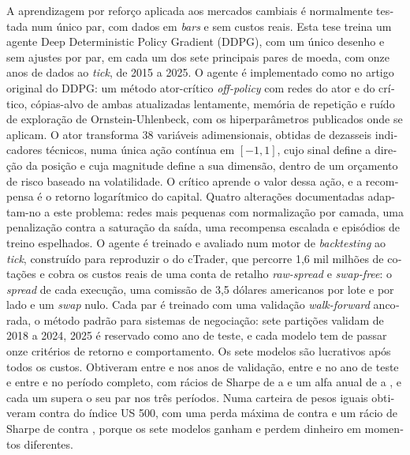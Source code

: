 \acresetall
\begin{otherlanguage}{portuguese}
\noindent A aprendizagem por reforço aplicada aos mercados cambiais é normalmente testada num único par, com dados em \textit{bars} e sem custos reais. Esta tese treina um agente Deep Deterministic Policy Gradient (DDPG), com um único desenho e sem ajustes por par, em cada um dos sete principais pares de moeda, com onze anos de dados ao \textit{tick}, de 2015 a 2025. O agente é implementado como no artigo original do DDPG: um método ator-crítico \textit{off-policy} com redes do ator e do crítico, cópias-alvo de ambas atualizadas lentamente, memória de repetição e ruído de exploração de Ornstein-Uhlenbeck, com os hiperparâmetros publicados onde se aplicam. O ator transforma 38 variáveis adimensionais, obtidas de dezasseis indicadores técnicos, numa única ação contínua em $[-1, 1]$, cujo sinal define a direção da posição e cuja magnitude define a sua dimensão, dentro de um orçamento de risco baseado na volatilidade. O crítico aprende o valor dessa ação, e a recompensa é o retorno logarítmico do capital. Quatro alterações documentadas adaptam-no a este problema: redes mais pequenas com normalização por camada, uma penalização contra a saturação da saída, uma recompensa escalada e episódios de treino espelhados. O agente é treinado e avaliado num motor de \textit{backtesting} ao \textit{tick}, construído para reproduzir o do cTrader, que percorre 1,6 mil milhões de cotações e cobra os custos reais de uma conta de retalho \textit{raw-spread} e \textit{swap-free}: o \textit{spread} de cada execução, uma comissão de 3,5 dólares americanos por lote e por lado e um \textit{swap} nulo. Cada par é treinado com uma validação \textit{walk-forward} ancorada, o método padrão para sistemas de negociação: sete partições validam de 2018 a 2024, 2025 é reservado como ano de teste, e cada modelo tem de passar onze critérios de retorno e comportamento. Os sete modelos são lucrativos após todos os custos. Obtiveram entre \ResultStitchedMinPT{} e \ResultStitchedMaxPT{} nos anos de validação, entre \ResultTestMinPT{} e \ResultTestMaxPT{} no ano de teste e entre \ResultFullMinPT{} e \ResultFullMaxPT{} no período completo, com rácios de Sharpe de \ResultSharpeMinPT{} a \ResultSharpeMaxPT{} e um alfa anual de \ResultAlphaMinPT{} a \ResultAlphaMaxPT{}, e cada um supera o seu par nos três períodos. Numa carteira de pesos iguais obtiveram \ResultPortfolioReturnPT{} contra \ResultBenchmarkReturnPT{} do índice US 500, com uma perda máxima de \ResultPortfolioDrawdownPT{} contra \ResultBenchmarkDrawdownPT{} e um rácio de Sharpe de \ResultPortfolioSharpePT{} contra \ResultBenchmarkSharpePT{}, porque os sete modelos ganham e perdem dinheiro em momentos diferentes.
\end{otherlanguage}
